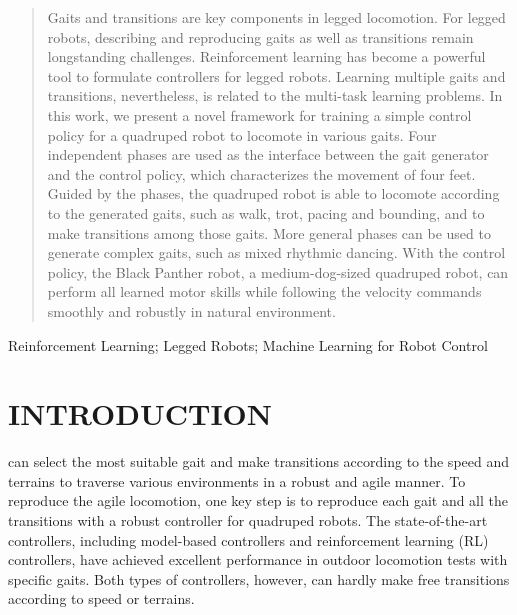 \documentclass[letterpaper, 10 pt, journal, twoside]{IEEEtran} %
\begin{document}
\begin{abstract}
Gaits and transitions are key components in legged locomotion. For legged robots, describing and reproducing gaits as well as transitions remain longstanding challenges. Reinforcement learning has become a powerful tool to formulate controllers for legged robots. Learning multiple gaits and transitions, nevertheless, is related to the multi-task learning problems. In this work, we present a novel framework for training a simple control policy for a quadruped robot to locomote in various gaits. Four independent phases are used as the interface between the gait generator and the control policy, which characterizes the movement of four feet. Guided by the phases, the quadruped robot is able to locomote according to the generated gaits, such as walk, trot, pacing and bounding, and to make transitions among those gaits. More general phases can be used to generate complex gaits, such as mixed rhythmic dancing.  With the control policy, the Black Panther robot, a medium-dog-sized quadruped robot, can perform all learned motor skills while following the velocity commands smoothly and robustly in natural environment.
\end{abstract}

\begin{IEEEkeywords}
	Reinforcement Learning; Legged Robots; Machine Learning for Robot Control
\end{IEEEkeywords}

\section{INTRODUCTION}
 can select the most suitable gait and make transitions according to the speed and terrains to traverse various environments in a robust and agile manner\cite{Hoyt1981,Drew2004}. To reproduce the agile locomotion, one key step is to reproduce each gait and all the transitions with a robust controller for quadruped robots. The state-of-the-art controllers, including model-based controllers\cite{8594448,kim2019highly,10.3389/frobt.2020.528473,gaertner2021collisionfree} and reinforcement learning (RL) controllers\cite{Hwangboeaau5872,Leeeabc5986,gangapurwala2020rloc,tan2018simtoreal}, have achieved excellent performance in outdoor locomotion tests with specific gaits. Both types of controllers, however, can hardly make free transitions according to speed or terrains.
\end{document}
